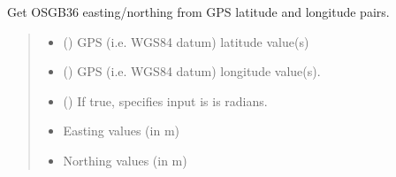 \documentclass[letterpaper,10pt,english]{sphinxmanual}
\begin{document}

\begin{fulllineitems}
\label{\detokenize{index:flood_tool.get_easting_northing_from_gps_lat_long}}
\pysigstartsignatures
{}
\pysigstopsignatures
\sphinxAtStartPar
Get OSGB36 easting/northing from GPS latitude and
longitude pairs.
\begin{quote}\begin{description}
\begin{itemize}
\item {} 
\sphinxAtStartPar
{} () \textendash{} GPS (i.e. WGS84 datum) latitude value(s)

\item {} 
\sphinxAtStartPar
{} () \textendash{} GPS (i.e. WGS84 datum) longitude value(s).

\item {} 
\sphinxAtStartPar
{} (\sphinxstyleliteralemphasis{\sphinxupquote{ (}}\sphinxstyleliteralemphasis{\sphinxupquote{)}}) \textendash{} If true, specifies input is is radians.

\end{itemize}

\sphinxAtStartPar
\begin{itemize}
\item {} 
\sphinxAtStartPar
{} \textendash{} Easting values (in m)

\item {} 
\sphinxAtStartPar
{} \textendash{} Northing values (in m)

\end{itemize}


\end{description}\end{quote}

\end{fulllineitems}
\end{document}
